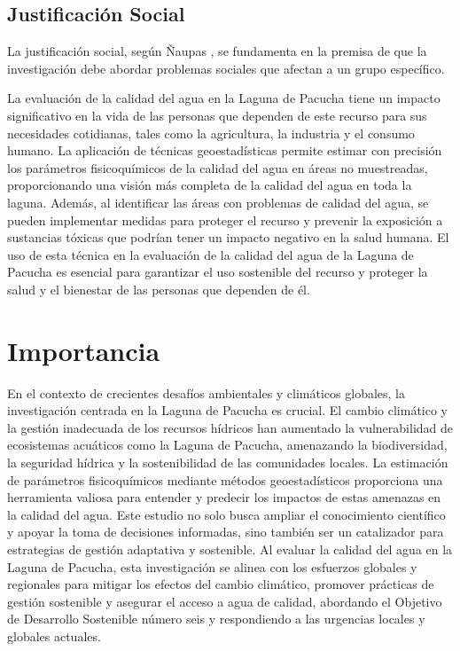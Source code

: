 \subsection{Justificación Social}

La justificación social, según Ñaupas \cite{naupas2014metodologia}, se fundamenta en la premisa de que la investigación debe abordar problemas sociales que afectan a un grupo específico.

La evaluación de la calidad del agua en la Laguna de Pacucha tiene un impacto significativo en la vida de las personas que dependen de este recurso para sus necesidades cotidianas, tales como la agricultura, la industria y el consumo humano. La aplicación de técnicas geoestadísticas permite estimar con precisión los parámetros fisicoquímicos de la calidad del agua en áreas no muestreadas, proporcionando una visión más completa de la calidad del agua en toda la laguna. Además, al identificar las áreas con problemas de calidad del agua, se pueden implementar medidas para proteger el recurso y prevenir la exposición a sustancias tóxicas que podrían tener un impacto negativo en la salud humana. El uso de esta técnica en la evaluación de la calidad del agua de la Laguna de Pacucha es esencial para garantizar el uso sostenible del recurso y proteger la salud y el bienestar de las personas que dependen de él.

\section{Importancia}

En el contexto de crecientes desafíos ambientales y climáticos globales, la investigación centrada en la Laguna de Pacucha es crucial. El cambio climático y la gestión inadecuada de los recursos hídricos han aumentado la vulnerabilidad de ecosistemas acuáticos como la Laguna de Pacucha, amenazando la biodiversidad, la seguridad hídrica y la sostenibilidad de las comunidades locales. La estimación de parámetros fisicoquímicos mediante métodos geoestadísticos proporciona una herramienta valiosa para entender y predecir los impactos de estas amenazas en la calidad del agua. Este estudio no solo busca ampliar el conocimiento científico y apoyar la toma de decisiones informadas, sino también ser un catalizador para estrategias de gestión adaptativa y sostenible. Al evaluar la calidad del agua en la Laguna de Pacucha, esta investigación se alinea con los esfuerzos globales y regionales para mitigar los efectos del cambio climático, promover prácticas de gestión sostenible y asegurar el acceso a agua de calidad, abordando el Objetivo de Desarrollo Sostenible número seis y respondiendo a las urgencias locales y globales actuales.

